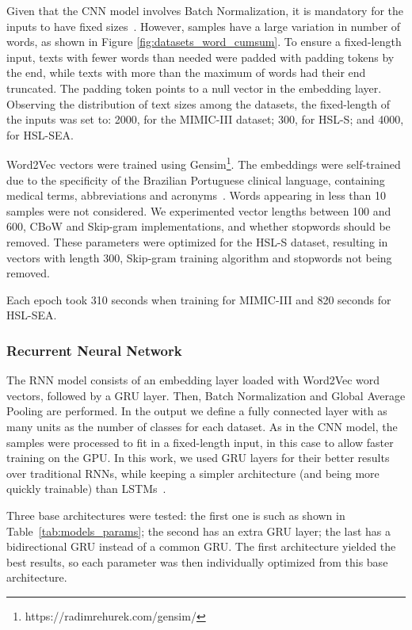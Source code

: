 \documentclass[runningheads]{llncs}
\begin{document}
Given that the CNN model involves Batch Normalization, it is mandatory for the inputs to have fixed sizes~\cite{ioffeBatchNormalizationAccelerating2015}. However, samples have a large variation in number of words, as shown in Figure \ref{fig:datasets_word_cumsum}. To ensure a fixed-length input, texts with fewer words than needed were padded with padding tokens by the end, while texts with more than the maximum of words had their end truncated. The padding token points to a null vector in the embedding layer. Observing the distribution of text sizes among the datasets, the fixed-length of the inputs was set to: 2000, for the MIMIC-III dataset; 300, for HSL-S; and 4000, for HSL-SEA. 

Word2Vec vectors were trained using Gensim\footnote{https://radimrehurek.com/gensim/}. The embeddings were self-trained due to the specificity of the Brazilian Portuguese clinical language, containing medical terms, abbreviations and acronyms~\cite{santosUsingDeepConvolutional2018}. Words appearing in less than 10 samples were not considered. We experimented vector lengths between 100 and 600, CBoW and Skip-gram implementations, and whether stopwords should be removed. These parameters were optimized for the HSL-S dataset, resulting in vectors with length 300, Skip-gram training algorithm and stopwords not being removed. 

Each epoch took 310 seconds when training for MIMIC-III and 820 seconds for HSL-SEA.


\subsubsection{Recurrent Neural Network}
\label{subsubsec:rnn_model}

The RNN model consists of an embedding layer loaded with Word2Vec word vectors, followed by a GRU layer. Then, Batch Normalization and Global Average Pooling are performed. In the output we define a fully connected layer with as many units as the number of classes for each dataset. As in the CNN model, the samples were processed to fit in a fixed-length input, in this case to allow faster training on the GPU. In this work, we used GRU layers for their better results over traditional RNNs, while keeping a simpler architecture (and being more quickly trainable) than LSTMs~\cite{chungEmpiricalEvaluationGated2014}.

Three base architectures were tested: the first one is such as shown in Table~\ref{tab:models_params}; the second has an extra GRU layer; the last has a bidirectional GRU instead of a common GRU. The first architecture yielded the best results, so each parameter was then individually optimized from this base architecture.
\end{document}
